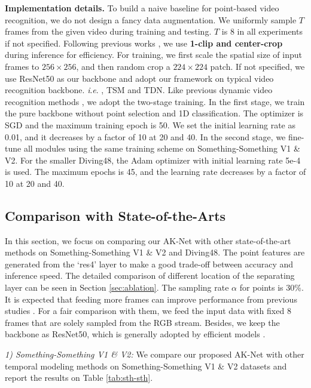 \documentclass[journal]{IEEEtran}
\newcommand{\ie}{\textit{i}.\textit{e}. }
\begin{document}
\textbf{Implementation details.}
To build a naive baseline for point-based video recognition, we do not design a fancy data augmentation.
We uniformly sample $T$ frames from the given video during training and testing.
$T$ is 8 in all experiments if not specified.
Following previous works \cite{lin2019tsm, li2020tea, wang2016temporal}, we use \textbf{1-clip and center-crop} during inference for efficiency.
For training, we first scale the spatial size of input frames to $256\times 256$, and then random crop a $224\times 224$ patch.
If not specified, we use ResNet50 \cite{he2016deep} as our backbone and adopt our framework on typical video recognition backbone. \ie, TSM \cite{lin2019tsm} and TDN\cite{wang2021tdn}.
Like previous dynamic video recognition methods \cite{Wang_2021_AdaFocus, meng2020adafuse}, we adopt the two-stage training.
In the first stage, we train the pure backbone without point selection and 1D classification.
The optimizer is SGD and the maximum training epoch is 50.
We set the initial learning rate as 0.01, and it decreases by a factor of 10 at 20 and 40.
In the second stage, we fine-tune all modules using the same training scheme on Something-Something V1 \& V2.
For the smaller Diving48, the Adam optimizer with initial learning rate 5e-4 is used.
The maximum epochs is 45, and the learning rate decreases by a factor of 10 at 20 and 40.

\subsection{Comparison with State-of-the-Arts}
In this section, we focus on comparing our AK-Net with other state-of-the-art methods on Something-Something V1 \& V2 and Diving48.
The point features are generated from the `res4' layer to make a good trade-off between accuracy and inference speed.
The detailed comparison of different location of the separating layer can be seen in Section \ref{sec:ablation}.
The sampling rate $\alpha$ for points is 30\%.
It is expected that feeding more frames can improve performance from previous studies \cite{wang2021tdn, lin2019tsm}.
For a fair comparison with them, we feed the input data with fixed 8 frames that are solely sampled from the RGB stream.
Besides, we keep the backbone as ResNet50, which is generally adopted by efficient models \cite{lin2019tsm, li2020tea, liu2020teinet, wang2021tdn}.

\textit{1) Something-Something V1 \& V2:}
We compare our proposed AK-Net with other temporal modeling methods on Something-Something V1 \& V2 datasets and report the results on Table \ref{tab:sth-sth}.
\end{document}
